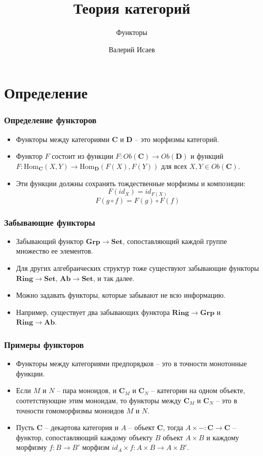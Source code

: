 \documentclass{beamer}
\theoremstyle{definition}
\newcommand{\cat}[1]{\mathbf{#1}}
\renewcommand{\C}{\cat{C}}
\newcommand{\D}{\cat{D}}
\newcommand{\Set}{\cat{Set}}
\newcommand{\Grp}{\cat{Grp}}
\newcommand{\Ab}{\cat{Ab}}
\newcommand{\Ring}{\cat{Ring}}
\newcommand{\fs}[1]{\mathrm{#1}}
\newcommand{\Hom}{\fs{Hom}}
\begin{document}
\title{Теория категорий}
\subtitle{Функторы}
\author{Валерий Исаев}
\maketitle

\section{Определение}

\begin{frame}
\frametitle{Определение функторов}
\begin{itemize}
\item Функторы между категориями $\C$ и $\D$ -- это морфизмы категорий.
\item Функтор $F$ состоит из функции $F : Ob(\C) \to Ob(\D)$ и функций $F : \Hom_\C(X, Y) \to \Hom_\D(F(X), F(Y))$ для всех $X, Y \in Ob(\C)$.
\item Эти функции должны сохранять тождественные морфизмы и композиции:
\[ F(id_X) = id_{F(X)} \]
\[ F(g \circ f) = F(g) \circ F(f) \]
\end{itemize}
\end{frame}

\begin{frame}
\frametitle{Забывающие функторы}
\begin{itemize}
\item Забывающий функтор $\Grp \to \Set$, сопоставляющий каждой группе множество ее элементов.
\item Для других алгебраических структур тоже существуют забывающие функторы $\Ring \to \Set$, $\Ab \to \Set$, и так далее.
\item Можно задавать функторы, которые забывают не всю информацию.
\item Например, существует два забывающих функтора $\Ring \to \Grp$ и $\Ring \to \Ab$.
\end{itemize}
\end{frame}

\begin{frame}
\frametitle{Примеры функторов}
\begin{itemize}
\item Функторы между категориями предпорядков -- это в точности монотонные функции.
\item Если $M$ и $N$ -- пара моноидов, и $\C_M$ и $\C_N$ -- категории на одном объекте, соотетствующие этим моноидам, то функторы между $\C_M$ и $\C_N$ -- это в точности гомоморфизмы моноидов $M$ и $N$.
\item Пусть $\C$ -- декартова категория и $A$ -- объект $\C$, тогда $A \times - : \C \to \C$ -- функтор, сопоставляющий каждому объекту $B$ объект $A \times B$ и каждому морфизму $f : B \to B'$ морфизм $id_A \times f : A \times B \to A \times B'$.
\end{itemize}
\end{frame}
\end{document}
